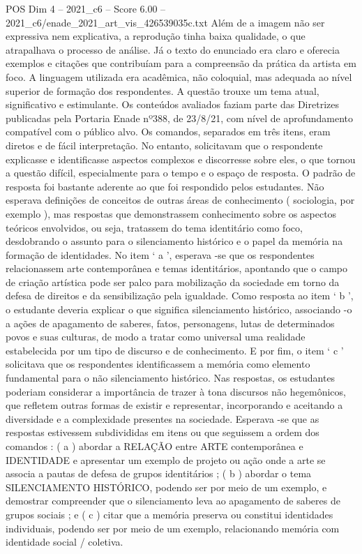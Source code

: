 \begin{textsample}{POS Dim 4 – 2021\_c6 – Score 6.00 – 2021\_c6/enade\_2021\_art\_vis\_426539035c.txt}
Além de a imagem não ser expressiva nem explicativa, a reprodução tinha baixa qualidade, o que atrapalhava o processo de análise.
Já o texto do enunciado era claro e oferecia exemplos e citações que contribuíam para a compreensão da prática da artista em foco.
A linguagem utilizada era acadêmica, não coloquial, mas adequada ao nível superior de formação dos respondentes.
A questão trouxe um tema atual, significativo e estimulante.
Os conteúdos avaliados faziam parte das Diretrizes publicadas pela Portaria Enade nº388, de 23/8/21, com nível de aprofundamento compatível com o público alvo.
Os comandos, separados em três itens, eram diretos e de fácil interpretação.
No entanto, solicitavam que o respondente explicasse e identificasse aspectos complexos e discorresse sobre eles, o que tornou a questão difícil, especialmente para o tempo e o espaço de resposta.
O padrão de resposta foi bastante aderente ao que foi respondido pelos estudantes.
Não esperava definições de conceitos de outras áreas de conhecimento ( sociologia, por exemplo ), mas respostas que demonstrassem conhecimento sobre os aspectos teóricos envolvidos, ou seja, tratassem do tema identitário como foco, desdobrando o assunto para o silenciamento histórico e o papel da memória na formação de identidades.
No item ‘ a ’, esperava -se que os respondentes relacionassem arte contemporânea e temas identitários, apontando que o campo de criação artística pode ser palco para mobilização da sociedade em torno da defesa de direitos e da sensibilização pela igualdade.
Como resposta ao item ‘ b ’, o estudante deveria explicar o que significa silenciamento histórico, associando -o a ações de apagamento de saberes, fatos, personagens, lutas de determinados povos e suas culturas, de modo a tratar como universal uma realidade estabelecida por um tipo de discurso e de conhecimento.
E por fim, o item ‘ c ’ solicitava que os respondentes identificassem a memória como elemento fundamental para o não silenciamento histórico.
Nas respostas, os estudantes poderiam considerar a importância de trazer à tona discursos não hegemônicos, que refletem outras formas de existir e representar, incorporando e aceitando a diversidade e a complexidade presentes na sociedade.
Esperava -se que as respostas estivessem subdivididas em itens ou que seguissem a ordem dos comandos : ( a ) abordar a RELAÇÃO entre ARTE contemporânea e IDENTIDADE e apresentar um exemplo de projeto ou ação onde a arte se associa a pautas de defesa de grupos identitários ; ( b ) abordar o tema SILENCIAMENTO HISTÓRICO, podendo ser por meio de um exemplo, e demostrar compreender que o silenciamento leva ao apagamento de saberes de grupos sociais ; e ( c ) citar que a memória preserva ou constitui identidades individuais, podendo ser por meio de um exemplo, relacionando memória com identidade social / coletiva.

\end{textsample}
